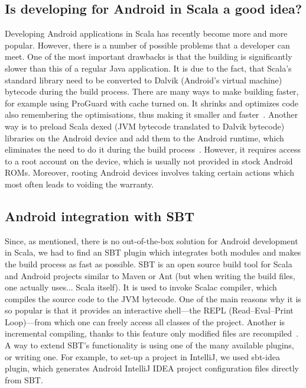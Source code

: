 \subsection{Is developing for Android in Scala a good idea?}
\label{subsec:good-idea}
Developing Android applications in Scala has recently become more and more popular. However, there is a number of possible problems that a developer can meet. One of the most important drawbacks is that the building is significantly slower than this of a regular Java application. It is due to the fact, that Scala's standard library need to be converted to Dalvik (Android's virtual machine) bytecode during the build process. There are many ways to make building faster, for example using ProGuard with cache turned on. It shrinks and optimizes code also remembering the optimisations, thus making it smaller and faster~\cite{Berkel:2011:preinstall}. Another way is to preload Scala dexed (JVM bytecode translated to Dalvik bytecode) libraries on the Android device and add them to the Android runtime, which eliminates the need to do it during the build process~\cite{Berkel:2011:preinstall}. However, it requires access to a root account on the device, which is usually not provided in stock Android ROMs. Moreover, rooting Android devices involves taking certain actions which most often leads to voiding the warranty.

\subsection{Android integration with SBT}
\label{subsec:android-sbt}
Since, as mentioned, there is no out-of-the-box solution for Android development in Scala, we had to find an SBT plugin which integrates both modules and makes the build process as fast as possible. SBT is an open source build tool for Scala and Android projects similar to Maven or Ant (but when writing the build files, one actually uses... Scala itself). It is used to invoke Scalac compiler, which compiles the source code to the JVM bytecode. One of the main reasons why it is so popular is that it provides an interactive shell---the REPL (Read--Eval--Print Loop)---from which one can freely access all classes of the project. Another is incremental compiling, thanks to this feature only modified files are recompiled~\cite{Fatin:2012:NewWay}. A way to extend SBT's functionality is using one of the many available plugins, or writing one. For example, to set-up a project in IntelliJ, we used sbt-idea plugin, which generates Android IntelliJ IDEA project configuration files directly from SBT.

